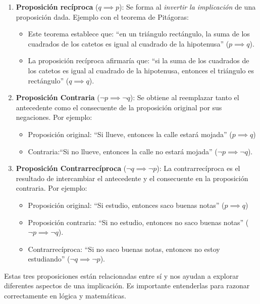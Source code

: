 \begin{enumerate}
	\item \textbf{Proposición recíproca} ($q \implies p$): Se forma al \textit{invertir la implicación} de una proposición dada. Ejemplo con el teorema de Pitágoras:
	\begin{itemize}
		\item Este teorema establece que: ``en un triángulo rectángulo, la suma de los cuadrados de los catetos es igual al cuadrado de la hipotenusa'' ($p \implies q$).
		
		
		\item La proposición recíproca afirmaría que: ``si la suma de los cuadrados de los catetos es igual al cuadrado de la hipotenusa, entonces el triángulo es rectángulo'' ($q \implies q$).
	\end{itemize}
	
	\item \textbf{Proposición Contraria} ($\neg p \implies \neg q$):
	Se obtiene al reemplazar tanto el antecedente como el consecuente de la proposición original por sus negaciones. Por ejemplo:
	
	\begin{itemize}
		\item Proposición original: ``Si llueve, entonces la calle estará mojada'' ($p \implies q$)
		\item Contraria:``Si no llueve, entonces la calle no estará mojada'' ($\neg p \implies \neg q$).
	\end{itemize}
	
	\item \textbf{Proposición Contrarrecíproca} ($\neg q \implies \neg p$): La contrarrecíproca es el resultado de intercambiar el antecedente y el consecuente en la proposición contraria. Por ejemplo:
	\begin{itemize}
		\item Proposición original: ``Si estudio, entonces saco buenas notas'' ($p \implies q$)
		\item Proposición contraria: ``Si no estudio, entonces no saco buenas notas'' ($\neg p \implies \neg q$).
		\item Contrarrecíproca: ``Si no saco buenas notas, entonces no estoy estudiando'' ($\neg q \implies \neg p$).
	\end{itemize}
\end{enumerate}

Estas tres proposiciones están relacionadas entre sí y nos ayudan a explorar diferentes aspectos de una implicación. Es importante entenderlas para razonar correctamente en lógica y matemáticas.

